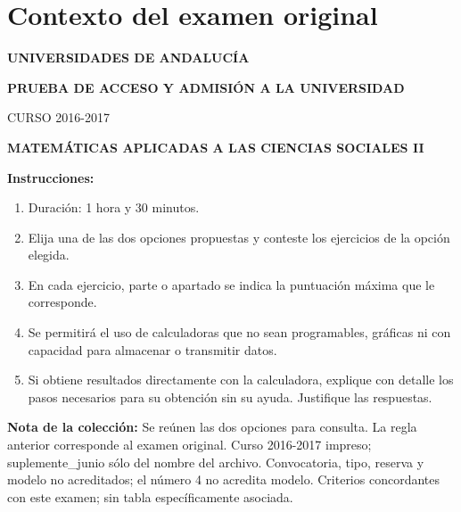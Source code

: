\section*{Contexto del examen original}
\textbf{UNIVERSIDADES DE ANDALUCÍA}\par
\textbf{PRUEBA DE ACCESO Y ADMISIÓN A LA UNIVERSIDAD}\par
CURSO 2016-2017\par
\textbf{MATEMÁTICAS APLICADAS A LAS CIENCIAS SOCIALES II}

\textbf{Instrucciones:}
\begin{enumerate}[label=\textbf{\alph*)}]
  \item Duración: 1 hora y 30 minutos.
  \item Elija una de las dos opciones propuestas y conteste los ejercicios de la opción elegida.
  \item En cada ejercicio, parte o apartado se indica la puntuación máxima que le corresponde.
  \item Se permitirá el uso de calculadoras que no sean programables, gráficas ni con capacidad para almacenar o transmitir datos.
  \item Si obtiene resultados directamente con la calculadora, explique con detalle los pasos necesarios para su obtención sin su ayuda. Justifique las respuestas.
\end{enumerate}
\noindent\textbf{Nota de la colección:} Se reúnen las dos opciones para consulta.
La regla anterior corresponde al examen original. Curso 2016-2017 impreso; suplemente\_junio sólo del nombre del archivo. Convocatoria, tipo, reserva y modelo no acreditados; el número 4 no acredita modelo. Criterios concordantes con este examen; sin tabla específicamente asociada.
\par\medskip
